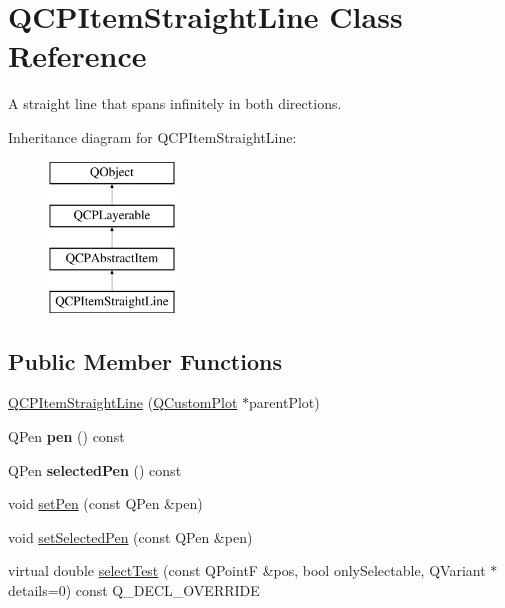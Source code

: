 \hypertarget{class_q_c_p_item_straight_line}{}\section{Q\+C\+P\+Item\+Straight\+Line Class Reference}
\label{class_q_c_p_item_straight_line}


A straight line that spans infinitely in both directions.  


Inheritance diagram for Q\+C\+P\+Item\+Straight\+Line\+:\begin{figure}[H]
\begin{center}
\leavevmode
\includegraphics[height=4.000000cm]{class_q_c_p_item_straight_line}
\end{center}
\end{figure}
\subsection*{Public Member Functions}
\begin{DoxyCompactItemize}
\item 
\hyperlink{class_q_c_p_item_straight_line_a41fd2e1f006983449eca9830930c3b10}{Q\+C\+P\+Item\+Straight\+Line} (\hyperlink{class_q_custom_plot}{Q\+Custom\+Plot} $\ast$parent\+Plot)
\item 
\mbox{\label{class_q_c_p_item_straight_line_aa751d46cf36073607c11508763f85ff6}} 
Q\+Pen {\bfseries pen} () const
\item 
\mbox{\label{class_q_c_p_item_straight_line_ae4a4607045b1d0594f89eee448a31ff9}} 
Q\+Pen {\bfseries selected\+Pen} () const
\item 
void \hyperlink{class_q_c_p_item_straight_line_a9f36c9c9e60d7d9ac084c80380ac8601}{set\+Pen} (const Q\+Pen \&pen)
\item 
void \hyperlink{class_q_c_p_item_straight_line_a5c33559498d33543fa95cf0a36e851ff}{set\+Selected\+Pen} (const Q\+Pen \&pen)
\item 
virtual double \hyperlink{class_q_c_p_item_straight_line_a2e36c9d4dcc3aeda78a5584f790e39e3}{select\+Test} (const Q\+PointF \&pos, bool only\+Selectable, Q\+Variant $\ast$details=0) const Q\+\_\+\+D\+E\+C\+L\+\_\+\+O\+V\+E\+R\+R\+I\+DE
\end{DoxyCompactItemize}
